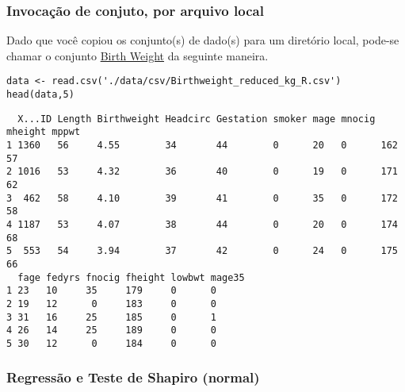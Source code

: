 \documentclass[11pt]{article}
\begin{document}
\subsubsection{Invocação de conjuto, por arquivo local}
\label{sec:org0c34511}

Dado que você copiou os conjunto(s) de dado(s) para um diretório
local, pode-se chamar o conjunto \href{https://drive.google.com/file/d/1xv2lCPsj04FjGPQ\_BgPS9mrTIjBcyHQk/view?usp=sharing}{Birth Weight} da seguinte maneira.

\begin{verbatim}
data <- read.csv('./data/csv/Birthweight_reduced_kg_R.csv')
head(data,5)
\end{verbatim}

\begin{verbatim}
  X...ID Length Birthweight Headcirc Gestation smoker mage mnocig mheight mppwt
1 1360   56     4.55        34       44        0      20   0      162     57   
2 1016   53     4.32        36       40        0      19   0      171     62   
3  462   58     4.10        39       41        0      35   0      172     58   
4 1187   53     4.07        38       44        0      20   0      174     68   
5  553   54     3.94        37       42        0      24   0      175     66   
  fage fedyrs fnocig fheight lowbwt mage35
1 23   10     35     179     0      0     
2 19   12      0     183     0      0     
3 31   16     25     185     0      1     
4 26   14     25     189     0      0     
5 30   12      0     184     0      0     
\end{verbatim}

\subsubsection{Regressão e Teste de Shapiro (normal)}
\label{sec:org06cae61}
\end{document}
